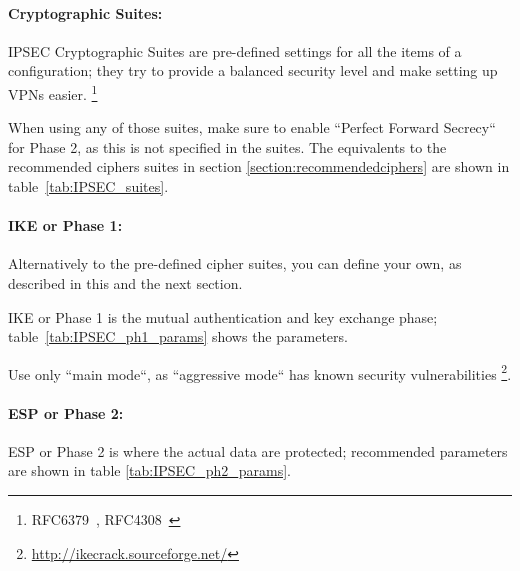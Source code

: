 \paragraph{Cryptographic Suites:}
IPSEC Cryptographic Suites are pre-defined settings for all the items
of a configuration; they try to provide a balanced security level and
make setting up VPNs easier.
\footnote{RFC6379~\cite{rfc6379}, RFC4308~\cite{rfc4308}}

When using any of those suites, make sure to enable ``Perfect Forward
Secrecy`` for Phase 2, as this is not specified in the suites. The
equivalents to the recommended ciphers suites in section
\ref{section:recommendedciphers} are shown in
table~\ref{tab:IPSEC_suites}.

\paragraph{IKE or Phase 1:}

Alternatively to the pre-defined cipher suites, you can define your
own, as described in this and the next section.

IKE or Phase 1 is the mutual authentication and key exchange phase;
table~\ref{tab:IPSEC_ph1_params} shows the parameters.

Use only ``main mode``, as ``aggressive mode`` has known security
vulnerabilities \footnote{\url{http://ikecrack.sourceforge.net/}}.


\paragraph{ESP or Phase 2:}
ESP or Phase 2 is where the actual data are protected; recommended
parameters are shown in table \ref{tab:IPSEC_ph2_params}.

